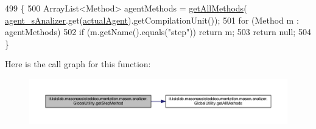 \begin{DoxyCode}
499                                         \{
500         ArrayList<Method> agentMethods = \hyperlink{classit_1_1isislab_1_1masonassisteddocumentation_1_1mason_1_1analizer_1_1_global_utility_a30195b9f55f1c7dd574b09d3d9a65995}{getAllMethods}(
      \hyperlink{classit_1_1isislab_1_1masonassisteddocumentation_1_1mason_1_1analizer_1_1_global_utility_aad25923935f25b348200a005914af973}{agent\_sAnalizer}.get(\hyperlink{classit_1_1isislab_1_1masonassisteddocumentation_1_1mason_1_1analizer_1_1_global_utility_ad969120645ce5135ca95177f6bb5ce42}{actualAgent}).getCompilationUnit());
501         \textcolor{keywordflow}{for} (Method m : agentMethods)
502             \textcolor{keywordflow}{if} (m.getName().equals(\textcolor{stringliteral}{"step"})) \textcolor{keywordflow}{return} m;
503         \textcolor{keywordflow}{return} null;
504     \}
\end{DoxyCode}


Here is the call graph for this function\-:
\nopagebreak
\begin{figure}[H]
\begin{center}
\leavevmode
\includegraphics[width=350pt]{classit_1_1isislab_1_1masonassisteddocumentation_1_1mason_1_1analizer_1_1_global_utility_aa9fb303191107df569745cc2178d4281_cgraph}
\end{center}
\end{figure}


